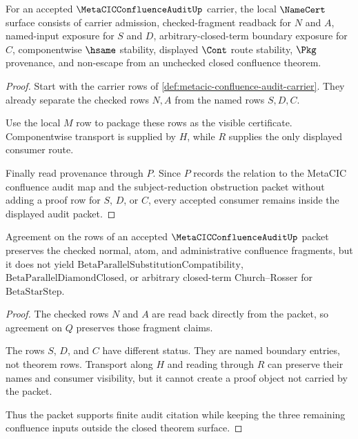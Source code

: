 \begin{theorem}
\label{thm:metacic-confluence-audit-namecert-obligations}
For an accepted $\MetaCICConfluenceAuditUp$ carrier, the local $\NameCert$ surface consists of carrier admission, checked-fragment readback for $N$ and $A$, named-input exposure for $S$ and $D$, arbitrary-closed-term boundary exposure for $C$, componentwise $\hsame$ stability, displayed $\Cont$ route stability, $\Pkg$ provenance, and non-escape from an unchecked closed confluence theorem.
\end{theorem}
\begin{proof}
Start with the carrier rows of \autoref{def:metacic-confluence-audit-carrier}. They already separate the checked rows $N,A$ from the named rows $S,D,C$.

Use the local $M$ row to package these rows as the visible certificate. Componentwise transport is supplied by $H$, while $R$ supplies the only displayed consumer route.

Finally read provenance through $P$. Since $P$ records the relation to the MetaCIC confluence audit map and the subject-reduction obstruction packet without adding a proof row for $S$, $D$, or $C$, every accepted consumer remains inside the displayed audit packet.
\end{proof}

\begin{theorem}
\label{thm:metacic-confluence-audit-conditional-boundary}
Agreement on the rows of an accepted $\MetaCICConfluenceAuditUp$ packet preserves the checked normal, atom, and administrative confluence fragments, but it does not yield $\mathrm{BetaParallelSubstitutionCompatibility}$, $\mathrm{BetaParallelDiamondClosed}$, or arbitrary closed-term Church--Rosser for $\mathrm{BetaStarStep}$.
\end{theorem}
\begin{proof}
The checked rows $N$ and $A$ are read back directly from the packet, so agreement on $Q$ preserves those fragment claims.

The rows $S$, $D$, and $C$ have different status. They are named boundary entries, not theorem rows. Transport along $H$ and reading through $R$ can preserve their names and consumer visibility, but it cannot create a proof object not carried by the packet.

Thus the packet supports finite audit citation while keeping the three remaining confluence inputs outside the closed theorem surface.
\end{proof}

